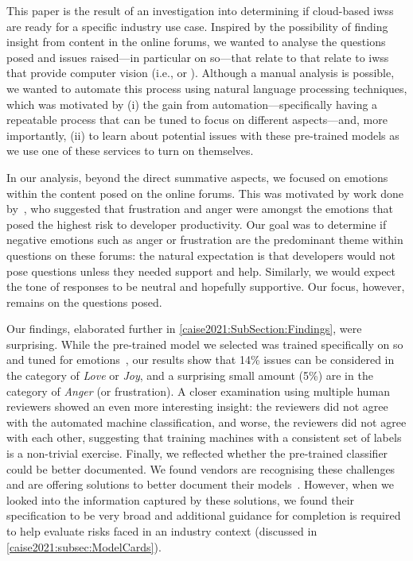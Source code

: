 This paper is the result of an investigation into determining if cloud-based \glspl{iws} are ready for a specific industry use case. Inspired by the possibility of finding insight from content in the online forums, we wanted to analyse the questions posed and issues raised---in particular on \gls{so}---that relate to that relate to  \glspl{iws} that provide computer vision (i.e.,  or ).  Although a manual analysis is possible, we wanted to automate this process using natural language processing techniques, which was motivated by (i) the gain from automation---specifically having a repeatable process that can be tuned to focus on different aspects---and, more importantly, (ii) to learn about potential issues with these pre-trained models as we use one of these services to turn on themselves.

In our analysis, beyond the direct summative aspects, we focused on emotions within the content posed on the online forums. This was motivated by work done by~\citet{wrobel2013}, who suggested that frustration and anger were amongst the emotions that posed the highest risk to developer productivity. Our goal was to determine if negative emotions such as anger or frustration are the predominant theme within questions on these forums: the natural expectation is that developers would not pose questions unless they needed support and help. Similarly, we would expect the tone of responses to be neutral and hopefully supportive. Our focus, however, remains on the questions posed.

Our findings, elaborated further in  \cref{caise2021:SubSection:Findings}, were surprising. While the pre-trained model we selected was trained specifically on \gls{so} and tuned for emotions~\citep{novielli2018,calefato2017}, our results show that 14\% issues can be considered in the category of \textit{Love} or \textit{Joy}, and a surprising small amount (5\%) are in the category of \textit{Anger} (or frustration). A closer examination using multiple human reviewers showed an even more interesting insight: the reviewers did not agree with the automated machine classification, and worse, the reviewers did not agree with each other, suggesting that training machines with a consistent set of labels is a non-trivial exercise.  Finally, we reflected whether the pre-trained classifier could be better documented.  We found vendors are recognising these challenges and are offering solutions to better document their models~\citep{Mitchell:2018in, Gebru:2018wh}. However, when we looked into the information captured by these solutions, we found their specification to be very broad and additional guidance for completion is required to help evaluate risks faced in an industry context (discussed in \cref{caise2021:subsec:ModelCards}).

